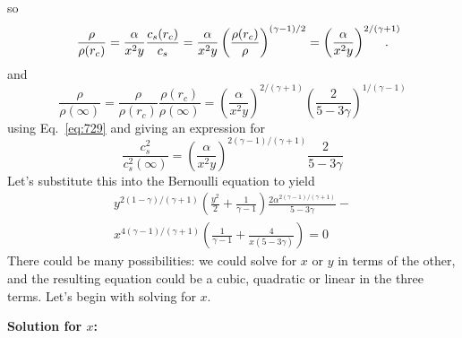 \documentclass{article}
\begin{document}
\begin{enumerate}
so
\begin{equation}
\frac{\rho}{\rho(r_c)} = \frac{\alpha}{x^2 y} \frac{c_s(r_c)}{c_s}
= \frac{\alpha}{x^2 y} \left (
  \frac{\rho(r_c)}{\rho} \right )^{(\gamma-1)/2} = \left ( \frac{\alpha}{x^2 y} \right )^{2/(\gamma+1)}\kern-0.5cm.
\end{equation}
and
\begin{equation}
\frac{\rho}{\rho(\infty)} = \frac{\rho}{\rho(r_c)}
\frac{\rho(r_c)}{\rho(\infty)}
= \left ( \frac{\alpha}{x^2 y} \right )^{2/(\gamma+1)} \left ( \frac{2}{5-3\gamma} \right )^{1/(\gamma-1)}
\end{equation}
using Eq.~\ref{eq:729} and giving an expression for
\begin{equation}
\frac{c_s^2}{c_s^2(\infty)} = \left ( \frac{\alpha}{x^2 y} \right )^{2(\gamma-1)/(\gamma+1)}  \frac{2}{5-3\gamma} 
\end{equation}
Let's substitute this into the Bernoulli equation to yield
\begin{eqnarray}
 y^{2(1-\gamma)/(\gamma+1)} \left ( \frac{y^2}{2} + \frac{1}{\gamma-1}
 \right ) \frac{2 \alpha^{2(\gamma-1)/(\gamma+1)}}{5 -3\gamma} -
 \nonumber \\
x^{4(\gamma-1)/(\gamma+1)}\left ( \frac{1}{\gamma-1}  
+ \frac{4}{x(5 - 3\gamma)} \right )
=0
\label{eq:789}
\end{eqnarray}
There could be many possibilities: we could solve for $x$ or $y$ in
terms of the other, and the resulting equation could be a cubic,
quadratic or linear in the three terms.  Let's begin with solving for
$x$.

{\bf Solution for $x$:}


\end{enumerate}
\end{document}
